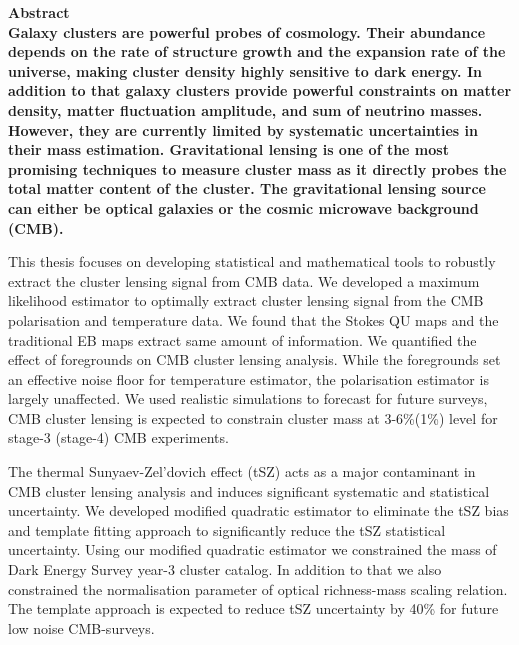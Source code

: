 \bfseries{Abstract}\mdseries\\                                                                                                
                                                                                                                             

Galaxy clusters are powerful probes of cosmology. 
Their abundance depends on the rate of structure growth and the expansion rate of the universe, making cluster density highly sensitive to dark energy. 
In addition to that galaxy clusters provide powerful constraints on matter density, matter fluctuation amplitude, and sum of neutrino masses.
 However, they are currently limited by systematic uncertainties in their mass estimation.
 Gravitational lensing is one of the most promising techniques to measure cluster mass as it directly probes the total matter content of the cluster. 
 The gravitational lensing source can either be optical galaxies or the cosmic microwave background (CMB). %
 
 This thesis focuses on developing statistical and mathematical tools to robustly extract the cluster lensing signal from CMB data. 
 We developed a maximum likelihood estimator to optimally extract cluster lensing signal from the CMB polarisation and temperature data. 
 We found that the Stokes QU maps and the traditional EB maps extract same amount of information. 
  We quantified the effect of foregrounds on CMB cluster lensing analysis. %
  While the foregrounds set an effective noise floor for temperature estimator, the polarisation estimator is largely unaffected. 
  We used realistic simulations to forecast for future surveys, CMB cluster lensing is expected to constrain cluster mass at 3-6\%(1\%) level for stage-3 (stage-4) CMB experiments. 
  
  The thermal Sunyaev-Zel'dovich effect (tSZ) acts as a major contaminant in CMB cluster lensing analysis and induces significant systematic and statistical uncertainty.
   We developed modified quadratic estimator to eliminate the tSZ bias and template fitting approach to significantly reduce the tSZ statistical uncertainty.
  Using our modified quadratic estimator we constrained the mass of Dark Energy Survey year-3 cluster catalog. In addition to that we also constrained the normalisation parameter of optical richness-mass scaling relation. 
  The template approach is expected to reduce tSZ uncertainty by 40\% for future low noise CMB-surveys.  
  
